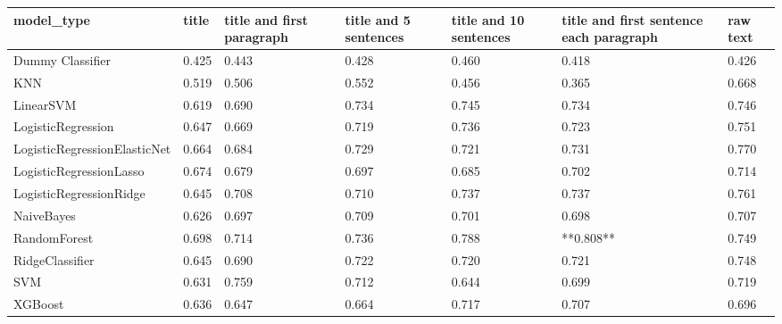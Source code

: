 \begin{tabular}{lllllll}
\toprule
                  model\_type & title & title and first paragraph & title and 5 sentences & title and 10 sentences & title and first sentence each paragraph & raw text \\
\midrule
            Dummy Classifier & 0.425 &                     0.443 &                 0.428 &                  0.460 &                                   0.418 &    0.426 \\
                         KNN & 0.519 &                     0.506 &                 0.552 &                  0.456 &                                   0.365 &    0.668 \\
                   LinearSVM & 0.619 &                     0.690 &                 0.734 &                  0.745 &                                   0.734 &    0.746 \\
          LogisticRegression & 0.647 &                     0.669 &                 0.719 &                  0.736 &                                   0.723 &    0.751 \\
LogisticRegressionElasticNet & 0.664 &                     0.684 &                 0.729 &                  0.721 &                                   0.731 &    0.770 \\
     LogisticRegressionLasso & 0.674 &                     0.679 &                 0.697 &                  0.685 &                                   0.702 &    0.714 \\
     LogisticRegressionRidge & 0.645 &                     0.708 &                 0.710 &                  0.737 &                                   0.737 &    0.761 \\
                  NaiveBayes & 0.626 &                     0.697 &                 0.709 &                  0.701 &                                   0.698 &    0.707 \\
                RandomForest & 0.698 &                     0.714 &                 0.736 &                  0.788 &                               **0.808** &    0.749 \\
             RidgeClassifier & 0.645 &                     0.690 &                 0.722 &                  0.720 &                                   0.721 &    0.748 \\
                         SVM & 0.631 &                     0.759 &                 0.712 &                  0.644 &                                   0.699 &    0.719 \\
                     XGBoost & 0.636 &                     0.647 &                 0.664 &                  0.717 &                                   0.707 &    0.696 \\
\bottomrule
\end{tabular}
